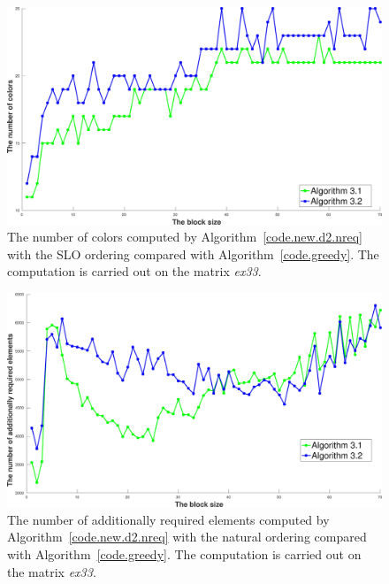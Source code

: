 \documentclass[12pt, twoside,a4paper,toc=bibliography]{scrbook}
\newcommand{\coderef}[1]{Algorithm~\protect\ref{#1}}
\begin{document}
\begin{figure}
\centering
\includegraphics[width=0.9\linewidth]{ex33_alg31_alg32_bls_slo_cols}
\caption{The number of colors computed by \coderef{code.new.d2.nreq} with the SLO ordering
compared with \coderef{code.greedy}. 
The computation is carried out on the matrix \textit{ex33}.}
\label{ex33_alg31_alg32_bls_slo_cols}
\end{figure}

\begin{figure}
\centering
\includegraphics[width=0.9\linewidth]{ex33_alg31_alg32_bls_nat_add}
\caption{The number of additionally required elements computed by 
\coderef{code.new.d2.nreq} with the natural ordering
compared with \coderef{code.greedy}.
The computation is carried out on the matrix \textit{ex33}. }
\label{ex33_alg31_alg32_bls_nat_add}
\end{figure}
\end{document}

